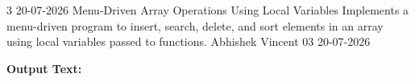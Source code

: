 \clearpage
\label{prog:03}
\programhead
  {3}
  {20-07-2026}
  {Menu-Driven Array Operations Using Local Variables}
  {Implements a menu-driven program to insert, search, delete, and sort elements in an array using local variables passed to functions.}
  {Abhishek Vincent}
  {03}
  {20-07-2026}

\divider
\textbf{Output Text:}\par
\vspace{2pt}

